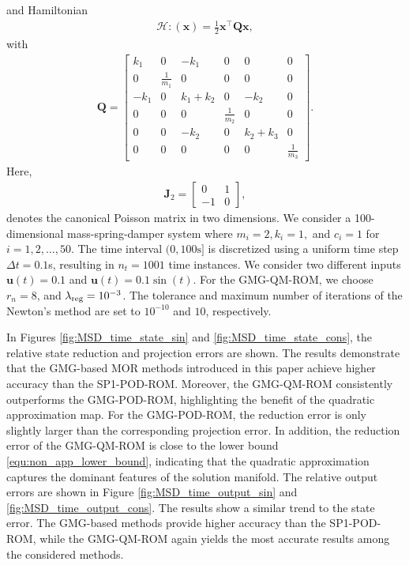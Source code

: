 \documentclass{article}
\newcommand{\bmQ}{\bm{Q}}
\newcommand{\Jmat}[1]{\mathbf{J}_{#1}}%
\newcommand{\jtwo}{\Jmat{2}}
\newcommand{\curlyH}{\mathcal{H}}
\newcommand{\statex}{{\bm x}}
\newcommand{\inputu}{\bm{u}}
\newcommand{\nlsize}{r_n}
\newcommand{\GMG}{\textsf{GMG}\xspace}
\newcommand{\QM}{\textsf{QM}\xspace} %
\newcommand{\POD}{\textsf{POD}\xspace}
\newcommand{\ROM}{\textsf{ROM}\xspace}
\newcommand{\MOR}{\textsf{MOR}\xspace}
\newcommand{\SPLin}{\textsf{SP1}\xspace}
\begin{document}
and Hamiltonian
\begin{align*}
		\curlyH\colon(\statex)=
	\frac{1}{2}\statex^{\top}\bmQ\statex,
\end{align*}
with
\begin{align*}
	\bmQ =
	\begin{bmatrix}
		k_1&0 & -k_1&0 &0 &0\\
		0&\frac{1}{m_1} & 0&0 &0 &0\\
		-k_1&0 & k_1+k_2&0 &-k_2 &0\\
		0&0 & 0&\frac{1}{m_2} &0 &0\\
		0&0 & -k_2&0 &k_2+k_3 &0\\
		0&0 & 0&0 &0 &\frac{1}{m_3}
	\end{bmatrix}.
\end{align*}
Here, 
\begin{align*}\jtwo=\begin{bmatrix}
	0&1\\
	-1&0
\end{bmatrix},
\end{align*} 
denotes the canonical Poisson matrix in two dimensions. 
We consider a 100-dimensional mass-spring-damper system where $m_i=2, k_i=1,$ and $c_i=1$ for $ i=1,2,\ldots,50$.  The time interval $(0,100\mathrm{s}]$ is discretized using a uniform time step $\Delta t = 0.1$s, resulting in $n_t = 1001$ time instances. We consider two different inputs $\inputu(t)= 0.1$ and $\inputu(t)=0.1\sin(t)$. 
For the \GMG-\QM-\ROM, we choose $\nlsize = 8$, and $\lambda_{\rm reg}=10^{-3}$. 
The tolerance and maximum number of iterations of the Newton's method are set to $10^{-10}$ and $10$, respectively.

In Figures \ref{fig:MSD_time_state_sin} and \ref{fig:MSD_time_state_cons}, the relative state reduction and projection errors are shown. 
The results demonstrate that the \GMG-based \MOR methods introduced in this paper achieve higher accuracy than the \SPLin-\POD-\ROM.
Moreover, the \GMG-\QM-\ROM consistently outperforms the \GMG-\POD-\ROM, highlighting the benefit of the quadratic approximation map.
For the \GMG-\POD-\ROM, the reduction error is only slightly larger than the corresponding projection error.
In addition, the reduction error of the \GMG-\QM-\ROM is close to the lower bound \eqref{equ:non_app_lower_bound}, indicating that the quadratic approximation captures the dominant features of the solution manifold.
The relative output errors are shown in Figure \ref{fig:MSD_time_output_sin} and \ref{fig:MSD_time_output_cons}. The results show a similar trend to the state error. The \GMG-based methods provide higher accuracy than the \SPLin-\POD-\ROM, while the \GMG-\QM-\ROM again yields the most accurate results among the considered methods.
\end{document}
